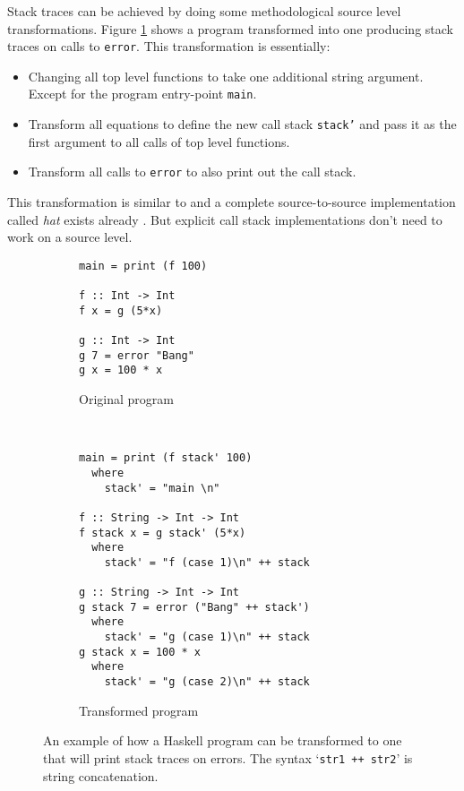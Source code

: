 Stack traces can be achieved by doing some methodological source level
transformations. Figure \ref{fig:transformation} shows a program transformed
into one producing stack traces on calls to \texttt{error}. This transformation is essentially:

\begin{itemize}
\itemsep1pt\parskip0pt
\item
  Changing all top level functions to take one additional string
  argument. Except for the program entry-point \texttt{main}.
\item
  Transform all equations to define the new call stack \texttt{stack'} and
  pass it as the first argument to all calls of top level functions.
\item
  Transform all calls to \texttt{error} to also print out the call stack.
\end{itemize}

This transformation is similar to \cite{source_transformation} and a
complete source-to-source implementation called \emph{hat} exists already
\cite{hat_website}. But explicit call stack implementations don't need
to work on a source level.

\begin{figure}
\begin{mdframed}
        \begin{subfigure}[t]{0.4\textwidth}
            \begin{verbatim}
main = print (f 100)

f :: Int -> Int
f x = g (5*x)

g :: Int -> Int
g 7 = error "Bang"
g x = 100 * x
            \end{verbatim}
            \caption{Original program}
        \end{subfigure}
        ~ %
        \begin{subfigure}[t]{0.6\textwidth}
          \begin{verbatim}
main = print (f stack' 100)
  where
    stack' = "main \n"

f :: String -> Int -> Int
f stack x = g stack' (5*x)
  where
    stack' = "f (case 1)\n" ++ stack

g :: String -> Int -> Int
g stack 7 = error ("Bang" ++ stack')
  where
    stack' = "g (case 1)\n" ++ stack
g stack x = 100 * x
  where
    stack' = "g (case 2)\n" ++ stack
          \end{verbatim}
          \caption{Transformed program}
        \end{subfigure}
        \caption{An example of how a Haskell program can be transformed to one
          that will print stack traces on errors. The syntax `\texttt{str1 ++
            str2}' is string concatenation.
        }\label{fig:transformation}
\end{mdframed}
\end{figure}

